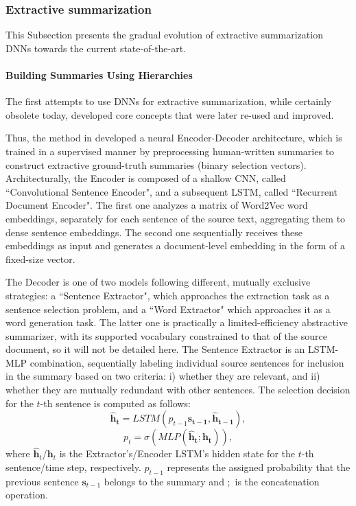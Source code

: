 \documentclass[preprint,review,10pt]{elsarticle}
\begin{document}
	\subsubsection{Extractive summarization}
	\label{sssec:extractive}
	This Subsection presents the gradual evolution of extractive summarization DNNs towards the current state-of-the-art.
	
	\paragraph{Building Summaries Using Hierarchies} The first attempts to use DNNs for extractive summarization, while certainly obsolete today, developed core concepts that were later re-used and improved.
	
	Thus, the method in \cite{lapata} developed a neural Encoder-Decoder architecture, which is trained in a supervised manner by preprocessing human-written summaries to construct extractive ground-truth summaries (binary selection vectors). Architecturally, the Encoder is composed of a shallow CNN, called ``Convolutional Sentence Encoder", and a subsequent LSTM, called ``Recurrent Document Encoder". The first one analyzes a matrix of Word2Vec word embeddings, separately for each sentence of the source text, aggregating them to dense sentence embeddings. The second one sequentially receives these embeddings as input and generates a document-level embedding in the form of a fixed-size vector.
	
	The Decoder is one of two models following different, mutually exclusive strategies: a ``Sentence Extractor", which approaches the extraction task as a sentence selection problem, and a ``Word Extractor" which approaches it as a word generation task. The latter one is practically a limited-efficiency abstractive summarizer, with its supported vocabulary constrained to that of the source document, so it will not be detailed here. The Sentence Extractor is an LSTM-MLP combination, sequentially labeling individual source sentences for inclusion in the summary based on two criteria: i) whether they are relevant, and ii) whether they are mutually redundant with other sentences. The selection decision for the $t$-th sentence is computed as follows:
	\begin{equation}
		\mathbf{\hat{h}_t} = LSTM(p_{t-1}\mathbf{s_{t-1}}, \mathbf{\hat{h}_{t-1}}),
	\end{equation}
	\begin{equation}
		p_t = \sigma(MLP(\mathbf{\hat{h}_t}; \mathbf{h_t})),
	\end{equation}
	\noindent where $\hat{\mathbf{h}}_t$/$\mathbf{h}_t$ is the Extractor's/Encoder LSTM's hidden state for the $t$-th sentence/time step, respectively. $p_{t-1}$ represents the assigned probability that the previous sentence $\mathbf{s}_{t-1}$ belongs to the summary and $;$ is the concatenation operation.
	
\end{document}
